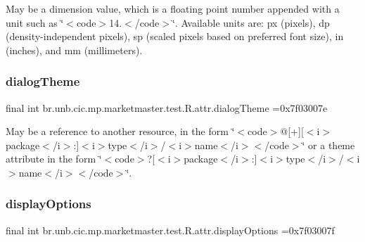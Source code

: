 May be a dimension value, which is a floating point number appended with a unit such as \char`\"{}$<$code$>$14.\+5sp$<$/code$>$\char`\"{}. Available units are\+: px (pixels), dp (density-\/independent pixels), sp (scaled pixels based on preferred font size), in (inches), and mm (millimeters). \mbox{\label{classbr_1_1unb_1_1cic_1_1mp_1_1marketmaster_1_1test_1_1R_1_1attr_a81b65d629db2d60e965c040c5d86b4a6}} 
\subsubsection{\texorpdfstring{dialog\+Theme}{dialogTheme}}
{\footnotesize\ttfamily final int br.\+unb.\+cic.\+mp.\+marketmaster.\+test.\+R.\+attr.\+dialog\+Theme =0x7f03007e\hspace{0.3cm}{\ttfamily [static]}}

May be a reference to another resource, in the form \char`\"{}$<$code$>$@\mbox{[}+\mbox{]}\mbox{[}$<$i$>$package$<$/i$>$\+:\mbox{]}$<$i$>$type$<$/i$>$/$<$i$>$name$<$/i$>$$<$/code$>$\char`\"{} or a theme attribute in the form \char`\"{}$<$code$>$?\mbox{[}$<$i$>$package$<$/i$>$\+:\mbox{]}$<$i$>$type$<$/i$>$/$<$i$>$name$<$/i$>$$<$/code$>$\char`\"{}. \mbox{\label{classbr_1_1unb_1_1cic_1_1mp_1_1marketmaster_1_1test_1_1R_1_1attr_a62f1d92052afe15b0990640f72fbe04c}} 
\subsubsection{\texorpdfstring{display\+Options}{displayOptions}}
{\footnotesize\ttfamily final int br.\+unb.\+cic.\+mp.\+marketmaster.\+test.\+R.\+attr.\+display\+Options =0x7f03007f\hspace{0.3cm}{\ttfamily [static]}}

